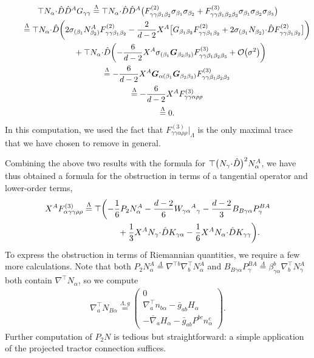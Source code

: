 \documentclass[pdftex]{sigma}
\numberwithin{equation}{section}
\newcommand{\bG}{\boldsymbol{G}}
\newcommand{\hd }{\hat{D}}
\renewcommand{\=}{\stackrel \Lambda =}
\newcommand{\csdot}{\hspace{-0.75mm} \cdot \hspace{-0.75mm}}
\begin{document}
\begin{gather*}
\top N_{\alpha} \csdot \hd \hd^A G_{\gamma \gamma} \= \top N_{\alpha} \csdot \hd \hd^A \bigl(F^{(2)}_{\gamma \gamma \beta_1 \beta_2} \sigma_{\beta_1} \sigma_{\beta_2} + F^{(3)}_{\gamma \gamma \beta_1 \beta_2 \beta_3} \sigma_{\beta_1} \sigma_{\beta_2} \sigma_{\beta_3}\bigr) \\
\qquad{}\= \top N_{\alpha} \csdot \hd \biggl( 2 \sigma_{(\beta_1} N^A_{\beta_2)} F^{(2)}_{\gamma \gamma \beta_1 \beta_2} - \frac{2}{d-2} X^A \bigl[ G_{\beta_1 \beta_2} F^{(2)}_{\gamma \gamma \beta_1 \beta_2} + 2 \sigma_{(\beta_1} N_{\beta_2)} \csdot \hd F^{(2)}_{\gamma \gamma \beta_1 \beta_2} \bigr] \biggr) \\
\quad\qquad{} + \top N_{\alpha} \csdot \hd \biggl(-\frac{6}{d-2} X^A \sigma_{(\beta_1} \bG_{\beta_2 \beta_3)} F^{(3)}_{\gamma \gamma \beta_1 \beta_2 \beta_3} + \mathcal{O}\bigl(\sigma^2\bigr) \biggr) \\
\qquad{}\= -\frac{6}{d-2} X^A \bG_{\alpha (\beta_1} \bG_{\beta_2 \beta_3)} F^{(3)}_{\gamma \gamma \beta_1 \beta_2 \beta_3} \\
\qquad{}\= -\frac{6}{d-2} X^A F^{(3)}_{\gamma \gamma \alpha \rho \rho} \\
\qquad{}\= 0 .
\end{gather*}
In this computation, we used the fact that $F^{(3)}_{\gamma \gamma \alpha \rho \rho}|_{\Lambda}$ is the only maximal trace that we have chosen to remove in general.

Combining the above two results with the formula for $\top \bigl(N_{\gamma} \csdot \hd\bigr)^2 N^A_{\alpha}$,
we have thus obtained a formula for the obstruction in terms of a tangential operator and lower-order terms,
\begin{gather}
X^A F^{(3)}_{\alpha \gamma \gamma \rho \rho} \= \top \biggl(-\frac{1}{6} P_{2} N^A_{\alpha} - \frac{d-2}{6} W_{\gamma \alpha}{}^A{}_{\gamma} - \frac{d-2}{3} B_{B \gamma \alpha} P^{BA}_{\gamma} \nonumber\\ \hphantom{X^A F^{(3)}_{\alpha \gamma \gamma \rho \rho} \= \top \biggl(}{}
 + \frac{1}{3} X^A N_{\gamma} \csdot \hd K_{\gamma \alpha} - \frac{1}{6} X^A N_{\alpha} \csdot \hd K_{\gamma \gamma} \biggr) .\label{F3-expression}
\end{gather}
To express the obstruction in terms of Riemannian quantities, we require a few more calculations. Note that both $P_2 N^A_{\alpha} \= \nabla^{\top b} \nabla^\top_b N^A_{\alpha}$ and $B_{B \gamma \alpha} P^{BA}_{\gamma} \= \beta^b_{\gamma \alpha} \nabla^\top_b N^A_{\gamma}$ both contain $\nabla^\top N_{\alpha}$, so we compute
\begin{align} \label{dtN}
\nabla^\top_a N_{B \alpha} \stackrel{\Lambda,g}{=} \begin{pmatrix}
0\\
\nabla^\top_a n_{b \alpha} - \bar{g}_{ab} H_{\alpha} \\
- \bar{\nabla}_a H_{\alpha} - \bar{g}_{ab} P^{bc} n^c_{\alpha}
\end{pmatrix}
 .
\end{align}
Further computation of $P_2 N$ is tedious but straightforward: a simple application of the projected tractor connection suffices.
\end{document}
